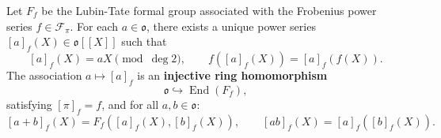 Let $F_f$ be the Lubin-Tate formal group associated with the Frobenius power series $f \in \mathcal{F}_\pi$. For each $a \in \mathfrak{o}$, there exists a unique power series $[a]_f(X) \in \mathfrak{o}[[X]]$ such that
$$
[a]_f(X) = aX \pmod{\deg 2}, \qquad f([a]_f(X)) = [a]_f(f(X)).
$$
The association $a \mapsto [a]_f$ is an \textbf{injective ring homomorphism}
$$
\mathfrak{o} \hookrightarrow \operatorname{End}(F_f),
$$
satisfying $[\pi]_f = f$, and for all $a, b \in \mathfrak{o}$:
$$
[a + b]_f(X) = F_f([a]_f(X), [b]_f(X)), \qquad [ab]_f(X) = [a]_f([b]_f(X)).
$$
